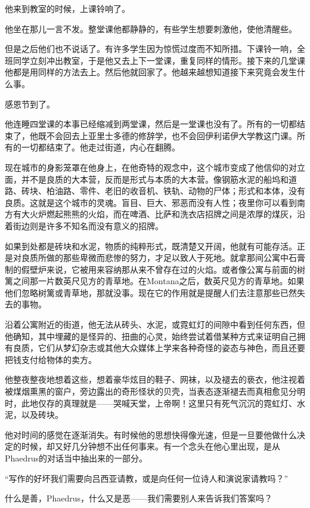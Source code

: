 \documentclass[UTF8]{article}
\begin{document}
\par 他来到教室的时候，上课铃响了。
\par 他坐在那儿一言不发。整堂课他都静静的，有些学生想要刺激他，使他清醒些。
\par 但是之后他们也不说话了。有许多学生因为惊慌过度而不知所措。下课铃一响，全班同学立刻冲出教室，于是他又去上下一堂课，重复同样的情形。接下来的几堂课他都是用同样的方法去上。然后他就回家了。他越来越想知道接下来究竟会发生什么事。
\par 感恩节到了。
\par 他连睡四堂课的本事已经缩减到两堂课，然后是一堂课也没有了。所有的一切都结束了，他既不会回去上亚里士多德的修辞学，也不会回伊利诺伊大学教这门课。所有的一切都结束了。他走过街道，内心在翻腾。
\par 现在城市的身影笼罩在他身上，在他奇特的观念中，这个城市变成了他信仰的对立面，并不是良质的大本营，反而是形式与本质的大本营。像钢筋水泥的船坞和道路、砖块、柏油路、零件、老旧的收音机、铁轨、动物的尸体；形式和本体，没有良质。这就是这个城市的灵魂。盲目、巨大、邪恶而没有人性；夜里你可以看到南方有大火炉燃起熊熊的火焰，而在啤酒、比萨和洗衣店招牌之间是浓厚的煤灰，沿着街边则是许多不知名而没有意义的招牌。
\par 如果到处都是砖块和水泥，物质的纯粹形式，既清楚又开阔，他就有可能存活。正是对良质所做的那些卑微而悲惨的努力，才足以致人于死地。就拿那间公寓中石膏制的假壁炉来说，它被用来容纳那从来不曾存在过的火焰。或者像公寓与前面的树篱之间那一片数英尺见方的青草地。在Montana之后，数英尺见方的青草地。如果他们忽略树篱或青草地，那就没事。现在它的作用就是提醒人们去注意那些已然失去的事物。
\par 沿着公寓附近的街道，他无法从砖头、水泥，或霓虹灯的间隙中看到任何东西，但他确知，其中埋藏的是怪异的、扭曲的心灵，始终尝试着借某种方式来证明自己拥有良质，它们从梦幻杂志或其他大众媒体上学来各种奇怪的姿态与神色，而且还要把钱支付给物体的卖方。
\par 他整夜整夜地想着这些，想着豪华炫目的鞋子、网袜，以及褪去的亵衣，他注视着被煤烟熏黑的窗户，旁边露出的奇形怪状的贝壳，当表态逐渐褪去而真相愈见分明时，此地仅存的真理就是——哭喊天堂，上帝啊！这里只有死气沉沉的霓虹灯、水泥，以及砖块。
\par 他对时间的感觉在逐渐消失。有时候他的思想快得像光速，但是一旦要他做什么决定的时候，却又好几分钟想不出任何事来。有一个念头在他心里出现，是从Phaedrus的对话当中抽出来的一部分。
\par “写作的好坏我们需要向吕西亚请教，或是向任何一位诗人和演说家请教吗？”
\par 什么是善，Phaedrus，什么又是恶——我们需要别人来告诉我们答案吗？
\end{document}
